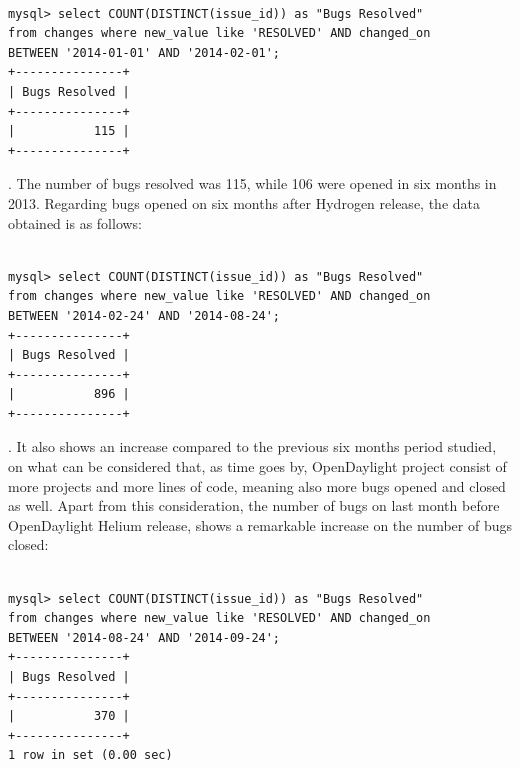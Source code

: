 \documentclass[a4paper, 12pt]{book}
\begin{document}
{\begin{verbatim}

mysql> select COUNT(DISTINCT(issue_id)) as "Bugs Resolved"
from changes where new_value like 'RESOLVED' AND changed_on
BETWEEN '2014-01-01' AND '2014-02-01';
+---------------+
| Bugs Resolved |
+---------------+
|           115 |
+---------------+

\end{verbatim}
. The number of bugs resolved was 115, while 106 were opened in six months in 2013. Regarding bugs opened on six months after Hydrogen release, the data obtained is as follows:
\begin{verbatim}

mysql> select COUNT(DISTINCT(issue_id)) as "Bugs Resolved"
from changes where new_value like 'RESOLVED' AND changed_on
BETWEEN '2014-02-24' AND '2014-08-24';
+---------------+
| Bugs Resolved |
+---------------+
|           896 |
+---------------+

\end{verbatim}

. It also shows an increase compared to the previous six months period studied, on what can be considered that, as time goes by, OpenDaylight project consist of more projects and more lines of code, meaning also more bugs opened and closed as well. Apart from this consideration, the number of bugs on last month before OpenDaylight Helium release, shows a remarkable increase on the number of bugs closed:

\begin{verbatim}

mysql> select COUNT(DISTINCT(issue_id)) as "Bugs Resolved"
from changes where new_value like 'RESOLVED' AND changed_on
BETWEEN '2014-08-24' AND '2014-09-24';
+---------------+
| Bugs Resolved |
+---------------+
|           370 |
+---------------+
1 row in set (0.00 sec)


\end{verbatim}}
\end{document}

